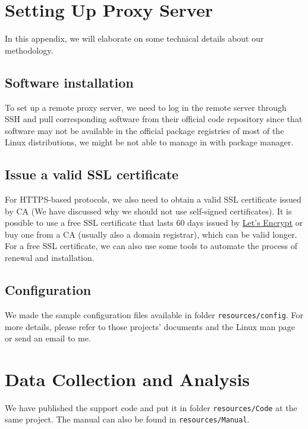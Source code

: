 \documentclass[conference]{IEEEtran}
\begin{document}




\appendix
\section{Setting Up Proxy Server}
In this appendix, we will elaborate on some technical details about our methodology.

\subsection{Software installation}
To set up a remote proxy server, we need to log in the remote server through SSH and pull corresponding software from their official code repository since that software may not be available in the official package registries of most of the Linux distributions, we might be not able to manage in with package manager.

\subsection{Issue a valid SSL certificate}
For HTTPS-based protocols, we also need to obtain a valid SSL certificate issued by CA (We have discussed why we should not use self-signed certificates). It is possible to use a free SSL certificate that lasts 60 days issued by \href{https://letsencrypt.org/}{Let's Encrypt} or buy one from a CA (usually also a domain registrar), which can be valid longer. For a free SSL certificate, we can also use some tools to automate the process of renewal and installation.

\subsection{Configuration}\label{sec:config}
We made the sample configuration files available in folder \texttt{resources/config}. For more details, please refer to those projects' documents and the Linux man page or send an email to me.

\appendix
\section{Data Collection and Analysis}
We have published the support code and put it in folder \texttt{resources/Code} at the same project. The manual can also be found in \texttt{resources/Manual}.
\end{document}
